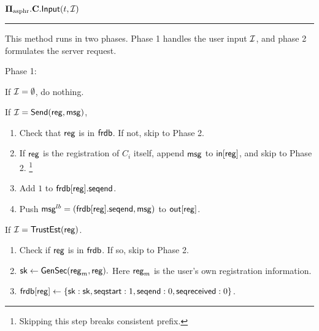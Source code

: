 \begin{definition}
\vspace{10pt}
$\mathbf{\Pi_{\text{asphr}}.C.\mathsf{Input}}(t, \mathcal{I})$
\vspace{5pt}
\hrule
\vspace{5pt}
This method runs in two phases. Phase 1 handles the user input $\mathcal{I}$, and phase 2 formulates the server request.

Phase 1: 

If $\mathcal{I} = \emptyset$, do nothing. 

If $\mathcal{I} = \mathsf{Send}(\mathsf{reg}, \mathsf{msg})$, 

\begin{enumerate}
    \item Check that $\mathsf{reg}$ is in $\mathsf{frdb}$. If not, skip to Phase 2.
    \item If $\mathsf{reg}$ is the registration of $C_i$ itself, append $\mathsf{msg}$ to $\mathsf{in}[\mathsf{reg}]$, and skip to Phase 2. \footnote{Skipping this step breaks consistent prefix.}
    \item Add $1$ to $\mathsf{frdb}[\mathsf{reg}].\mathsf{seqend}$. 
    \item Push $\mathsf{msg}^{lb} = (\mathsf{frdb}[\mathsf{reg}].\mathsf{seqend}, \mathsf{msg})$ to $\mathsf{out}[\mathsf{reg}]$.
\end{enumerate}

If $\mathcal{I} = \mathsf{TrustEst}(\mathsf{reg})$.
\begin{enumerate}
    \item Check if $\mathsf{reg}$ is in $\mathsf{frdb}$. If so, skip to Phase 2.
    \item ${\mathsf{sk}} \leftarrow \mathsf{GenSec}(\mathsf{reg}_m, \mathsf{reg}).$ Here $\mathsf{reg}_m$ is the user's own registration information.
    \item $\mathsf{frdb}[\mathsf{reg}] \leftarrow \{{\mathsf{sk}}: {\mathsf{sk}},  \mathsf{seqstart}: 1, \mathsf{seqend}: 0, \mathsf{seqreceived}: 0\}$.
\end{enumerate}


\end{definition}
